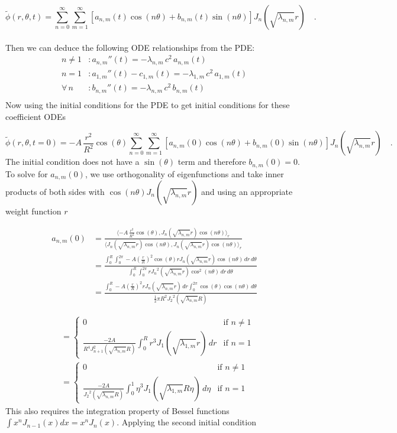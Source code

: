 \documentclass{homework}
\begin{document}
\[ \tilde{\phi}(r, \theta , t) = \sum^\infty_{n=0} \sum^\infty_{m=1} [a_{n,m}(t) \cos(n \theta) + b_{n,m}(t) \sin(n \theta) ] J_n (\sqrt{\lambda_{n,m}} r) \quad . \]
\\ \noindent
Then we can deduce the following ODE relationships from the PDE:
\begin{align*}
n \neq 1 &: a_{n,m}''(t) = -\lambda_{n,m} \, c^2 \, a_{n,m}(t) \\
n = 1 &: a_{1,m}''(t) - c_{1,m}(t) = -\lambda_{1,m} \, c^2 \, a_{1,m}(t) \\
\forall \, n &: b_{n,m}''(t) = -\lambda_{n,m} \, c^2 \, b_{n,m}(t) \\
\end{align*}
\noindent
Now using the initial conditions for the PDE to get initial conditions for these coefficient ODEs

\[ \tilde{\phi}(r, \theta , t=0) = -A \, \frac{r^2}{R^2} \cos(\theta) \sum^\infty_{n=0} \sum^\infty_{m=1} [a_{n,m}(0) \cos(n \theta) + b_{n,m}(0) \sin(n \theta) ] J_n (\sqrt{\lambda_{n,m}} r) \quad .\]
\noindent
The initial condition does not have a $\sin(\theta)$ term and therefore $b_{n,m}(0) = 0$. To solve for $a_{n,m}(0)$, we use orthogonality of eigenfunctions and take inner products of both sides with $\cos(n \theta) J_n(\sqrt{\lambda_{n,m}} r)$ and using an appropriate weight function $r$

\begin{align*}
a_{n,m}(0) &= \frac{\langle -A \, \frac{r^2}{R^2} \cos(\theta), J_n(\sqrt{\lambda_{n,m}} r) \cos(n \theta) \rangle_r}{\langle J_n(\sqrt{\lambda_{n,m}} r) \cos(n \theta), J_n(\sqrt{\lambda_{n,m}} r) \cos(n \theta) \rangle_r} \\
&= \frac{\int^R_0 \int^{2 \pi}_0 -A (\frac{r}{R})^2 \cos(\theta) r J_n (\sqrt{\lambda_{n,m}} r) \cos(n \theta) \, dr \, d \theta}{\int^R_0 \int^{2 \pi}_0 r {J_n}^2 (\sqrt{\lambda_{n,m}} r) \cos^2(n \theta) \, dr \, d \theta} \\
&= \frac{\int^R_0 -A (\frac{r}{R})^2 r J_n (\sqrt{\lambda_{n,m}} r) \, dr \int^{2 \pi}_0 \cos(\theta) \cos(n \theta) \, d \theta}{\frac{1}{2} \pi R^2 {J_2}^2 (\sqrt{\lambda_{n,m}} R)}
\end{align*}

\begin{align*}
    &= \begin{cases}
    0 & \textrm{if $n \neq 1$} \\
    \frac{-2A}{R^4 J_{n+1}^2 (\sqrt{\lambda_{n,m}} R)} \int^R_0 r^3 J_1 (\sqrt{\lambda_{1,m}} r) \, dr & \textrm{if $n = 1$}
    \end{cases} \\
    &= \begin{cases}
    0 & \textrm{if $n \neq 1$} \\
    \frac{-2A}{{J_2}^2 (\sqrt{\lambda_{n,m}} R)} \int^1_0 \eta^3 J_1 (\sqrt{\lambda_{1,m}} R \eta) \, d \eta & \textrm{if $n = 1$}
    \end{cases}
\end{align*}
\noindent
This also requires the integration property of Bessel functions $\int x^n J_{n-1}(x) dx = x^n J_n(x)$. Applying the second initial condition
\end{document}
